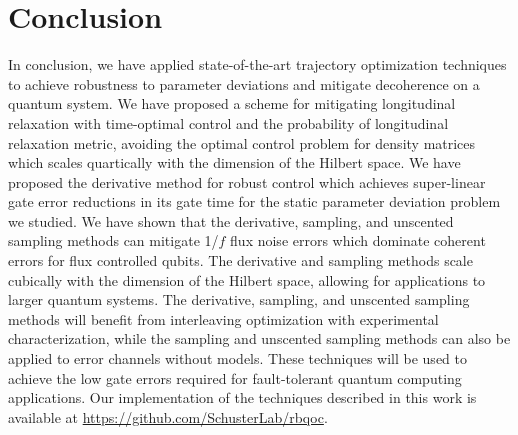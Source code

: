 \section{Conclusion}
In conclusion, we have applied state-of-the-art trajectory
optimization techniques to achieve robustness to parameter deviations
and mitigate decoherence on a quantum system.
We have proposed a scheme for mitigating
longitudinal relaxation with time-optimal
control and the probability of longitudinal relaxation metric,
avoiding the optimal control problem for density matrices which scales quartically with
the dimension of the Hilbert space.
We have proposed the derivative method for robust control which achieves
super-linear gate error reductions in its gate time for the static parameter
deviation problem we studied.
We have shown that the derivative, sampling, and unscented sampling methods
can mitigate 1/$f$ flux noise errors
which dominate coherent errors for flux controlled qubits.
The derivative and sampling methods scale cubically with
the dimension of the Hilbert space, allowing for applications
to larger quantum systems.
The derivative, sampling, and unscented sampling
methods will benefit from interleaving optimization with
experimental characterization, while the sampling and unscented
sampling methods can also be applied to error channels without models.
These techniques will be used to achieve the low gate errors
required for fault-tolerant quantum computing applications. Our
implementation of the techniques described in this work is available
at \url{https://github.com/SchusterLab/rbqoc}.
